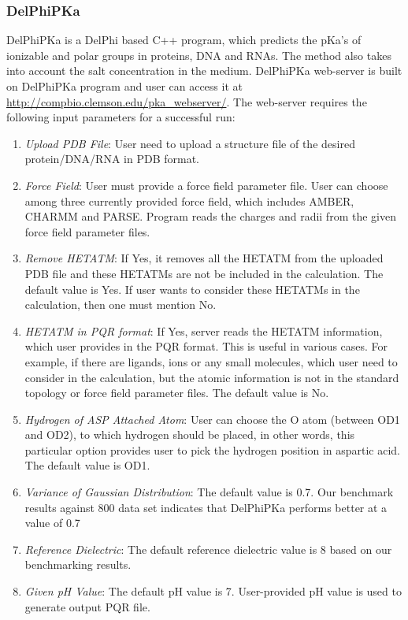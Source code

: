 \documentclass[9pt,tutorial]{livecoms}
\begin{document}
\subsubsection{DelPhiPKa}
DelPhiPKa\cite{wang2015pka} is a DelPhi based C++ program, which predicts the pKa’s of ionizable and polar groups in proteins, DNA and RNAs. The method also takes into account the salt concentration in the medium\cite{pahari2018delphipka}. DelPhiPKa web-server is built on DelPhiPKa program and user can access it at \url{http://compbio.clemson.edu/pka_webserver/}. The web-server requires the following input parameters for a successful run:
\begin{enumerate}
    \item \textit{ Upload PDB File}: User need to upload a structure file of the desired protein/DNA/RNA in PDB format.
    \item \textit{ Force Field}: User must provide a force field parameter file. User can choose among three currently provided force field, which includes AMBER, CHARMM and PARSE. Program reads the charges and radii from the given force field parameter files.
    \item \textit{ Remove HETATM}: If Yes, it removes all the HETATM from the uploaded PDB file and these HETATMs are not be included in the calculation. The default value is Yes. If user wants to consider these HETATMs in the calculation, then one must mention No.
    \item \textit{ HETATM in PQR format}: If Yes, server reads the HETATM information, which user provides in the PQR format. This is useful in various cases. For example, if there are ligands, ions or any small molecules, which user need to consider in the calculation, but the atomic information is not in the standard topology or force field parameter files. The default value is No. 
    \item \textit{ Hydrogen of ASP Attached Atom}: User can choose the O atom (between OD1 and OD2), to which hydrogen should be placed, in other words, this particular option provides user to pick the hydrogen position in aspartic acid. The default value is OD1.
    \item \textit{ Variance of Gaussian Distribution}: The default value is 0.7. Our benchmark results against 800 data set indicates that DelPhiPKa performs better at a value of 0.7 
    \item \textit{ Reference Dielectric}: The default reference dielectric value is 8 based on our benchmarking results. 
    \item \textit{ Given pH Value}: The default pH value is 7. User-provided pH value is used to generate output PQR file.

\end{enumerate}
\end{document}
